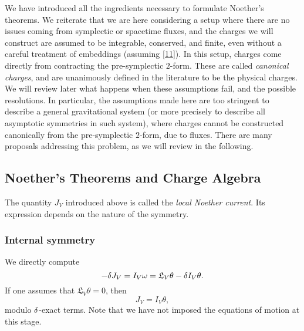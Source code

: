  
We have introduced all the ingredients necessary to formulate Noether’s theorems. We reiterate that we are here considering a setup where there are no issues coming from symplectic or spacetime fluxes, and the charges we will construct are assumed to be integrable, conserved, and finite, even without a careful treatment of embeddings (assuming \eqref{11}). In this setup, charges come directly from contracting the pre-symplectic $2$-form. These are called \textit{canonical charges}, and are unanimously defined in the literature to be the physical charges. We will review later what happens when these assumptions fail, and the possible resolutions. In particular, the assumptions made here are too stringent to describe a general gravitational system (or more precisely to describe all asymptotic symmetries in such system), where charges cannot be constructed canonically from the pre-symplectic $2$-form, due to fluxes. There are many proposals addressing this problem, as we will review in the following.

\subsection{Noether's Theorems and Charge Algebra}
The quantity $J_V$ introduced above is called the \textit{local Noether current}. Its expression depends on the nature of the symmetry.

\subsubsection*{Internal symmetry} We directly compute
\begin{equation}\label{13}
	-\delta J_V=I_V\omega=\mathfrak{L}_V\theta-\delta I_V\theta.
\end{equation}
If one assumes that $\mathfrak{L}_V\theta=0$, then
\begin{equation}\label{14}
	J_V=I_V\theta,
\end{equation}
modulo $\delta$-exact terms. Note that we have not imposed the equations of motion at this stage.

